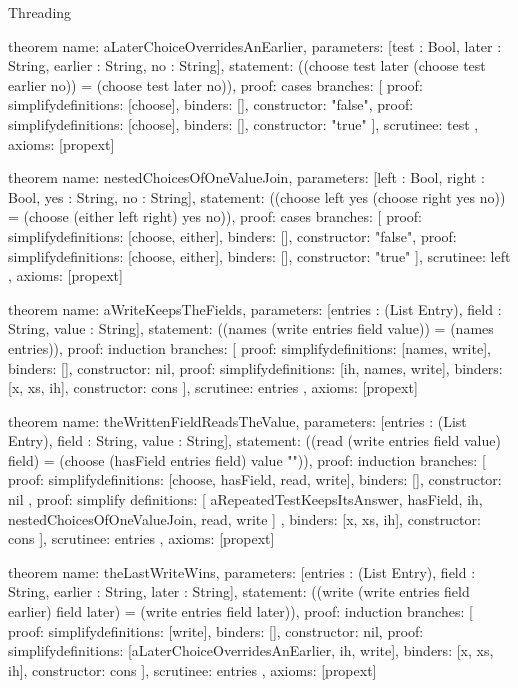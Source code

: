 \begin{lexlean}{Threading}
\begin{semanticmodule}
theorem{
  name: aLaterChoiceOverridesAnEarlier,
  parameters: [test : Bool, later : String, earlier : String, no : String],
  statement: ((choose test later (choose test earlier no)) = (choose test later no)),
  proof: cases{
    branches: [
      {proof: simplify{definitions: [choose]}, binders: [], constructor: "false"},
      {proof: simplify{definitions: [choose]}, binders: [], constructor: "true"}
    ],
    scrutinee: test
  },
  axioms: [propext]
}

theorem{
  name: nestedChoicesOfOneValueJoin,
  parameters: [left : Bool, right : Bool, yes : String, no : String],
  statement: ((choose left yes (choose right yes no)) = (choose (either left right) yes no)),
  proof: cases{
    branches: [
      {proof: simplify{definitions: [choose, either]}, binders: [], constructor: "false"},
      {proof: simplify{definitions: [choose, either]}, binders: [], constructor: "true"}
    ],
    scrutinee: left
  },
  axioms: [propext]
}

theorem{
  name: aWriteKeepsTheFields,
  parameters: [entries : (List Entry), field : String, value : String],
  statement: ((names (write entries field value)) = (names entries)),
  proof: induction{
    branches: [
      {proof: simplify{definitions: [names, write]}, binders: [], constructor: nil},
      {proof: simplify{definitions: [ih, names, write]}, binders: [x, xs, ih], constructor: cons}
    ],
    scrutinee: entries
  },
  axioms: [propext]
}

theorem{
  name: theWrittenFieldReadsTheValue,
  parameters: [entries : (List Entry), field : String, value : String],
  statement: ((read (write entries field value) field) = (choose (hasField entries field) value "")),
  proof: induction{
    branches: [
      {
        proof: simplify{definitions: [choose, hasField, read, write]},
        binders: [],
        constructor: nil
      },
      {
        proof: simplify{
          definitions: [
            aRepeatedTestKeepsItsAnswer,
            hasField,
            ih,
            nestedChoicesOfOneValueJoin,
            read,
            write
          ]
        },
        binders: [x, xs, ih],
        constructor: cons
      }
    ],
    scrutinee: entries
  },
  axioms: [propext]
}

theorem{
  name: theLastWriteWins,
  parameters: [entries : (List Entry), field : String, earlier : String, later : String],
  statement: ((write (write entries field earlier) field later) = (write entries field later)),
  proof: induction{
    branches: [
      {proof: simplify{definitions: [write]}, binders: [], constructor: nil},
      {
        proof: simplify{definitions: [aLaterChoiceOverridesAnEarlier, ih, write]},
        binders: [x, xs, ih],
        constructor: cons
      }
    ],
    scrutinee: entries
  },
  axioms: [propext]
}


\end{semanticmodule}
\end{lexlean}
